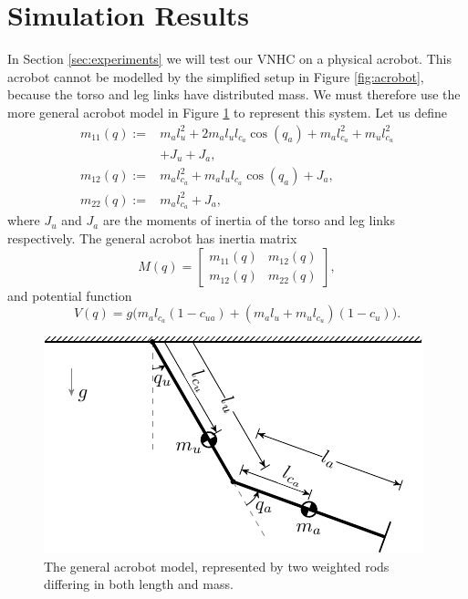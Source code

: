 \documentclass[journal,twoside,web, twocolumn,draftcls]{ieeecolor}
\begin{document}
\section{Simulation Results}\label{sec:simulations}
In Section \ref{sec:experiments} we will test our VNHC on a physical acrobot.
This acrobot cannot be modelled by the simplified setup in Figure
\ref{fig:acrobot}, because the torso and leg links have 
distributed mass. 
We must therefore use the more general acrobot model in Figure
\ref{fig:acrobot-model} to represent this system.
Let us define 
\begin{align*}
    m_{11}(q) := &m_a l_u^2 + 2m_al_ul_{c_a}\cos(q_a) + m_al_{c_a}^2 +
    m_ul_{c_u}^2 \\
                 &+ J_u + J_a
                 , \\
    m_{12}(q) := &m_al_{c_a}^2 + m_al_ul_{c_a}\cos(q_a) + J_a
    , \\
    m_{22}(q) := &m_al_{c_a}^2 + J_a,
\end{align*}
where \(J_u\) and \(J_a\) are the moments of inertia of the torso and leg links
respectively. 
The general acrobot has inertia matrix
\begin{equation*}
    M(q) = \begin{bmatrix}
        m_{11}(q) & m_{12}(q) \\
        m_{12}(q) & m_{22}(q)
    \end{bmatrix}
    ,
\end{equation*}
and potential function
\begin{equation*}
    V(q) = g\big(m_al_{c_a}(1-c_{ua})
    + (m_al_u + m_ul_{c_u})(1-c_u)\big)
    .
\end{equation*}

\begin{figure}
    \centering
    \includegraphics[width=0.8\linewidth]{acrobot_model.pdf}
    \caption{The general acrobot model, represented by two weighted rods
    differing in both length and mass.}%
    \label{fig:acrobot-model}
\end{figure}
\end{document}
